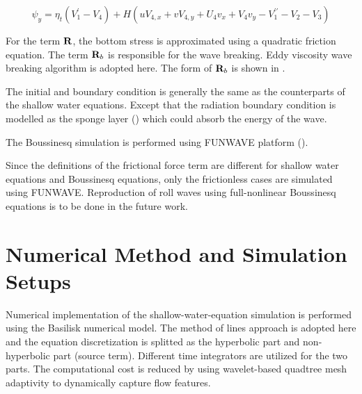 \documentclass{jfm}
\begin{document}
\begin{equation}
\psi_y =  \eta_t (V_1^{\prime}-V_4) + H \left( u V_{4,x} + v V_{4,y} + U_4 v_x +V_4 v_y - V_1^{\prime \prime} -  V_2 -  V_3 \right) 
\end{equation}

For the term $\bf R$, the bottom stress is approximated using a quadratic friction equation. The term ${\bf{R}}_{b} $ is responsible for the wave breaking. Eddy viscosity wave breaking algorithm is adopted here. The form of ${\bf{R}}_{b} $ is shown in \cite{Kennedy2000}.

The initial and boundary condition is generally the same as the counterparts of the shallow water equations. Except that the radiation boundary condition is modelled as the sponge layer (\cite{Larsen1983}) which could absorb the energy of the wave.



The Boussinesq simulation is performed using FUNWAVE platform (\cite{Shietal2012}).

Since the definitions of the frictional force term are different for shallow water equations and Boussinesq equations, only the frictionless cases are simulated using FUNWAVE. Reproduction of roll waves using full-nonlinear Boussinesq  equations is to be done in the future work.


\section{Numerical Method and Simulation Setups}
Numerical implementation of the shallow-water-equation simulation is performed using the Basilisk numerical model. The method of lines approach is adopted here and the equation discretization is splitted as the hyperbolic part and non-hyperbolic part (source term). Different time integrators are utilized for the two parts. The computational cost is reduced by using wavelet-based quadtree mesh adaptivity to dynamically capture flow features.
\end{document}
